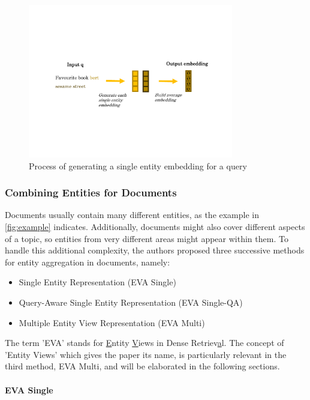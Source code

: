 \begin{figure}[!htb]
    \centering
    \includegraphics[trim={2cm 5.9cm 2cm 6.5cm}, clip, width=0.8\textwidth]{resources/queries} 
    \caption{Process of generating a single entity embedding for a query}
    \label{fig:queries}
\end{figure}

\subsubsection{Combining Entities for Documents}\label{subsec:models}

Documents usually contain many different entities, as the example in \autoref{fig:example} indicates. Additionally, documents might also cover different aspects of a topic, so entities from very different areas might appear within them. To handle this additional complexity, the authors proposed three successive methods for entity aggregation in documents, namely:

\begin{itemize}
    \item Single Entity Representation (EVA Single)
    \item Query-Aware Single Entity Representation (EVA Single-QA)
    \item Multiple Entity View Representation (EVA Multi)
\end{itemize}

The term 'EVA' stands for \underline{E}ntity \underline{V}iews in Dense Retriev\underline{a}l. The concept of 'Entity Views' which gives the paper its name, is particularly relevant in the third method, EVA Multi, and will be elaborated in the following sections.

\paragraph*{EVA Single}

